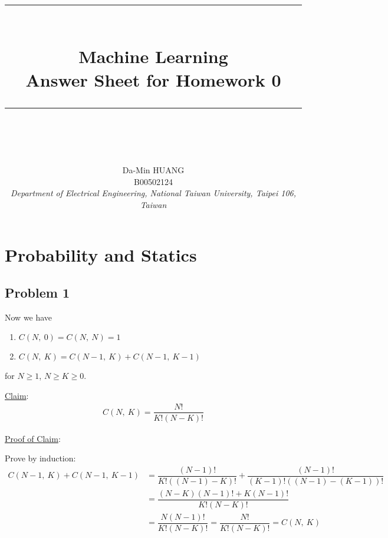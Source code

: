 \documentclass[12pt]{article}
\newcommand{\ParTh}[1]{\left(#1\right)}
\newcommand{\horrule}[1]{\rule{\linewidth}{#1}}
\begin{document}
\baselineskip 6.5mm
\setlength{\parindent}{0pt}
\title{ 
\normalfont \normalsize 
\horrule{0.5pt} \\[0.4cm]
\huge { \Huge Machine Learning \\ \large Answer Sheet for Homework 0 }\\ %
\horrule{2pt} \\ [0.5cm]
}
\author{ { \Large Da-Min HUANG } \\
{\small B00502124} \\
{\small \textit{Department of Electrical Engineering, National Taiwan University, Taipei 106, Taiwan} }
}
\allowdisplaybreaks[4]
\maketitle

\section{Probability and Statics}

\subsection*{Problem 1}

Now we have
\begin{enumerate}
\item $C\ParTh{N,~0}=C\ParTh{N,~N}=1$
\item $C\ParTh{N,~K}=C\ParTh{N-1,~K}+C\ParTh{N-1,~K-1}$
\end{enumerate}
for $N\geq1$, $N\geq K\geq0$.

\underline{Claim}:
\begin{align}
C\ParTh{N,~K}=\dfrac{N!}{K!\ParTh{N-K}!}
\end{align}

\underline{Proof of Claim}:

Prove by induction:
\begin{align}
C\ParTh{N-1,~K}+C\ParTh{N-1,~K-1}&=\dfrac{\ParTh{N-1}!}{K!\ParTh{\ParTh{N-1}-K}!}+\dfrac{\ParTh{N-1}!}{\ParTh{K-1}!\ParTh{\ParTh{N-1}-\ParTh{K-1}}!}\\
&=\dfrac{\ParTh{N-K}\ParTh{N-1}!+K\ParTh{N-1}!}{K!\ParTh{N-K}!}\\
&=\dfrac{N\ParTh{N-1}!}{K!\ParTh{N-K}!}=\dfrac{N!}{K!\ParTh{N-K}!}=C\ParTh{N,~K}
\end{align}
\end{document}

